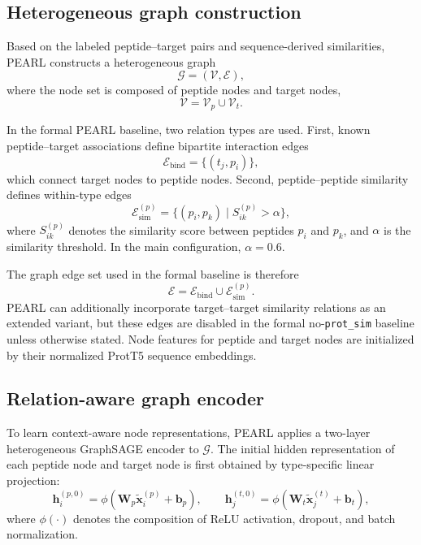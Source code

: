 \subsection{Heterogeneous graph construction}

Based on the labeled peptide--target pairs and sequence-derived similarities, PEARL constructs a heterogeneous graph
\begin{equation}
\mathcal{G} = (\mathcal{V}, \mathcal{E}),
\end{equation}
where the node set is composed of peptide nodes and target nodes,
\begin{equation}
\mathcal{V} = \mathcal{V}_p \cup \mathcal{V}_t.
\end{equation}

In the formal PEARL baseline, two relation types are used. First, known peptide--target associations define bipartite interaction edges
\begin{equation}
\mathcal{E}_{\mathrm{bind}} = \{(t_j, p_i)\},
\end{equation}
which connect target nodes to peptide nodes. Second, peptide--peptide similarity defines within-type edges
\begin{equation}
\mathcal{E}_{\mathrm{sim}}^{(p)}
=
\{(p_i, p_k) \mid S_{ik}^{(p)} > \alpha\},
\end{equation}
where $S_{ik}^{(p)}$ denotes the similarity score between peptides $p_i$ and $p_k$, and $\alpha$ is the similarity threshold. In the main configuration, $\alpha = 0.6$.

The graph edge set used in the formal baseline is therefore
\begin{equation}
\mathcal{E} = \mathcal{E}_{\mathrm{bind}} \cup \mathcal{E}_{\mathrm{sim}}^{(p)}.
\end{equation}
PEARL can additionally incorporate target--target similarity relations as an extended variant, but these edges are disabled in the formal no-\texttt{prot\_sim} baseline unless otherwise stated. Node features for peptide and target nodes are initialized by their normalized ProtT5 sequence embeddings.

\subsection{Relation-aware graph encoder}

To learn context-aware node representations, PEARL applies a two-layer heterogeneous GraphSAGE encoder to $\mathcal{G}$. The initial hidden representation of each peptide node and target node is first obtained by type-specific linear projection:
\begin{equation}
\mathbf{h}_{i}^{(p,0)} = \phi \left( \mathbf{W}_{p}\tilde{\mathbf{x}}_{i}^{(p)} + \mathbf{b}_{p} \right),
\qquad
\mathbf{h}_{j}^{(t,0)} = \phi \left( \mathbf{W}_{t}\tilde{\mathbf{x}}_{j}^{(t)} + \mathbf{b}_{t} \right),
\end{equation}
where $\phi(\cdot)$ denotes the composition of ReLU activation, dropout, and batch normalization.


